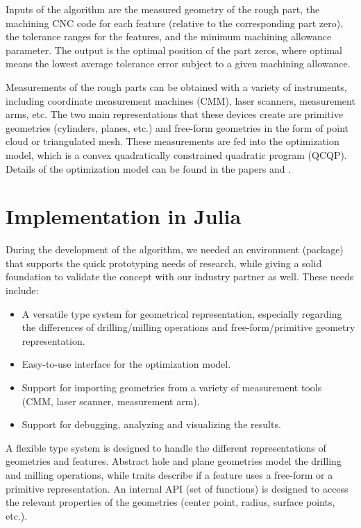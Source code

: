 \documentclass{juliacon}
\begin{document}
Inputs of the algorithm are the measured geometry of the rough part, the machining CNC code for each feature (relative to the corresponding part zero), the tolerance ranges for the features, and the minimum machining allowance parameter.
The output is the optimal position of the part zeros, where optimal means the lowest average tolerance error subject to a given machining allowance.

Measurements of the rough parts can be obtained with a variety of instruments, including coordinate measurement machines (CMM), laser scanners, measurement arms, etc.
The two main representations that these devices create are primitive geometries (cylinders, planes, etc.) and free-form geometries in the form of point cloud or triangulated mesh.
These measurements are fed into the optimization model, which is a convex quadratically constrained quadratic program (QCQP).
Details of the optimization model can be found in the papers \cite{cserteg:2023_CMS} and \cite{cserteg:2023_Annals}.

\section{Implementation in Julia}
\label{sec:approach}

During the development of the algorithm, we needed an environment (package) that supports the quick prototyping needs of research, while giving a solid foundation to validate the concept with our industry partner as well.
These needs include:

\begin{itemize}
	\item A versatile type system for geometrical representation, especially regarding the differences of drilling/milling operations and free-form/primitive geometry representation.
	\item Easy-to-use interface for the optimization model.
	\item Support for importing geometries from a variety of measurement tools (CMM, laser scanner, measurement arm).
	\item Support for debugging, analyzing and visualizing the results.
\end{itemize}

A flexible type system is designed to handle the different representations of geometries and features.
Abstract hole and plane geometries model the drilling and milling operations, while traits describe if a feature uses a free-form or a primitive representation.
An internal API (set of functions) is designed to access the relevant properties of the geometries (center point, radius, surface points, etc.).
\end{document}
